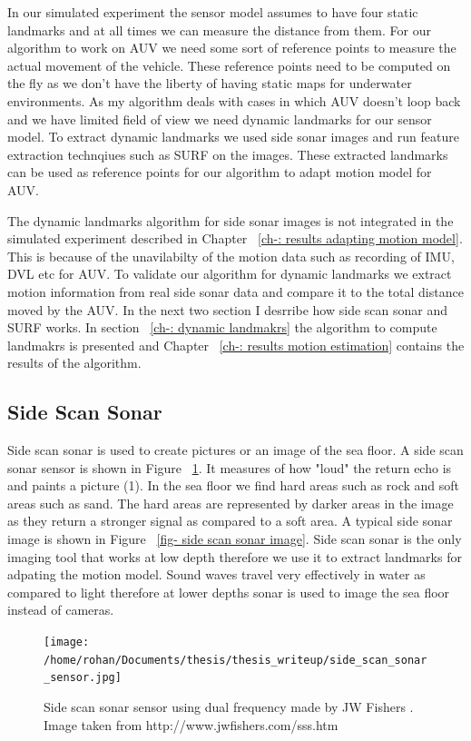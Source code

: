 \documentclass[12pt,draft]{dalcsthesis}
\begin{document}
In our simulated experiment the sensor model assumes to have four static landmarks and at all times we can measure the distance from them. For our algorithm to work on AUV we need some sort of reference points to measure the actual movement of the vehicle. These reference points need to be computed on the fly as we don't have the liberty of having static maps for underwater environments. As my algorithm deals with cases in which AUV doesn't loop back and we have limited field of view we need dynamic landmarks for our sensor model. To extract dynamic landmarks we used side sonar images and run feature extraction technqiues such as SURF on the images. These extracted landmarks can be used as reference points for our algorithm to adapt motion model for AUV.

The dynamic landmarks algorithm for side sonar images is not integrated in the simulated experiment described in Chapter ~\ref{ch-: results adapting motion model}. This is because of the unavilabilty of the motion data such as recording of IMU, DVL etc for AUV. To validate our algorithm for dynamic landmarks we extract motion information from real side sonar data and compare it to the total distance moved by the AUV. In the next two section I desrribe how side scan sonar and SURF works. In section ~\ref{ch-: dynamic landmakrs} the algorithm to compute landmakrs is presented and Chapter ~\ref{ch-: results motion estimation} contains the results of the algorithm.  



\subsection{Side Scan Sonar} 
Side scan sonar is used to create pictures or an image of the sea floor. A side scan sonar sensor is shown in Figure ~\ref{fig- side scan sonar sensor}. It measures of how "loud" the return echo is and paints a picture (1). In the sea floor we find  hard areas such as rock and soft areas such as sand. The hard areas are represented by darker areas in the image as they return a stronger signal as compared to a soft area. A typical side sonar image is shown in Figure ~\ref{fig- side scan sonar image}. Side scan sonar is the only imaging tool that works at low depth therefore we use it to extract landmarks for adpating the motion model. Sound waves travel very effectively in water as compared to light therefore at lower depths sonar is used to image the sea floor instead of cameras. 
\begin{figure}
  \centering
     {\texttt{[image: /home/rohan/Documents/thesis/thesis\_writeup/side\_scan\_sonar\_sensor.jpg]}}
  \caption{\label{fig- side scan sonar sensor} Side scan sonar sensor using dual frequency made by JW Fishers . Image taken from \cite{}{http://www.jwfishers.com/sss.htm} }
\end{figure}
\end{document}
